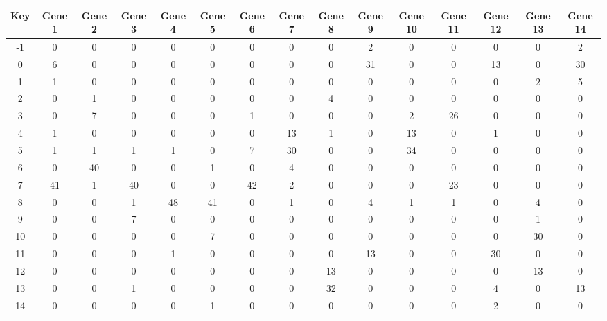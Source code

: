 \begin{tabular}{|c|c|c|c|c|c|c|c|c|c|c|c|c|c|c|}
\hline
Key & Gene 1 & Gene 2 & Gene 3 & Gene 4 & Gene 5 & Gene 6 & Gene 7 & Gene 8 & Gene 9 & Gene 10 & Gene 11 & Gene 12 & Gene 13 & Gene 14 \\
\hline
-1 & 0 & 0 & 0 & 0 & 0 & 0 & 0 & 0 & 2 & 0 & 0 & 0 & 0 & 2 \\
0 & 6 & 0 & 0 & 0 & 0 & 0 & 0 & 0 & 31 & 0 & 0 & 13 & 0 & 30 \\
1 & 1 & 0 & 0 & 0 & 0 & 0 & 0 & 0 & 0 & 0 & 0 & 0 & 2 & 5 \\
2 & 0 & 1 & 0 & 0 & 0 & 0 & 0 & 4 & 0 & 0 & 0 & 0 & 0 & 0 \\
3 & 0 & 7 & 0 & 0 & 0 & 1 & 0 & 0 & 0 & 2 & 26 & 0 & 0 & 0 \\
4 & 1 & 0 & 0 & 0 & 0 & 0 & 13 & 1 & 0 & 13 & 0 & 1 & 0 & 0 \\
5 & 1 & 1 & 1 & 1 & 0 & 7 & 30 & 0 & 0 & 34 & 0 & 0 & 0 & 0 \\
6 & 0 & 40 & 0 & 0 & 1 & 0 & 4 & 0 & 0 & 0 & 0 & 0 & 0 & 0 \\
7 & 41 & 1 & 40 & 0 & 0 & 42 & 2 & 0 & 0 & 0 & 23 & 0 & 0 & 0 \\
8 & 0 & 0 & 1 & 48 & 41 & 0 & 1 & 0 & 4 & 1 & 1 & 0 & 4 & 0 \\
9 & 0 & 0 & 7 & 0 & 0 & 0 & 0 & 0 & 0 & 0 & 0 & 0 & 1 & 0 \\
10 & 0 & 0 & 0 & 0 & 7 & 0 & 0 & 0 & 0 & 0 & 0 & 0 & 30 & 0 \\
11 & 0 & 0 & 0 & 1 & 0 & 0 & 0 & 0 & 13 & 0 & 0 & 30 & 0 & 0 \\
12 & 0 & 0 & 0 & 0 & 0 & 0 & 0 & 13 & 0 & 0 & 0 & 0 & 13 & 0 \\
13 & 0 & 0 & 1 & 0 & 0 & 0 & 0 & 32 & 0 & 0 & 0 & 4 & 0 & 13 \\
14 & 0 & 0 & 0 & 0 & 1 & 0 & 0 & 0 & 0 & 0 & 0 & 2 & 0 & 0 \\
\hline
\end{tabular}